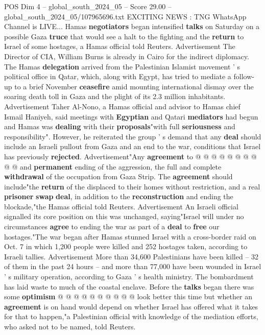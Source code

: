 \begin{textsample}{POS Dim 4 – global\_south\_2024\_05 – Score 29.00 – global\_south\_2024\_05/107965696.txt}  \label{ex:f4_pos_181}
EXCITING NEWS : TNG WhatsApp Channel is LIVE...
Hamas \textbf{negotiators} began intensified \textbf{talks} on Saturday on a possible Gaza \textbf{truce} that would see a halt to the fighting and the \textbf{return} to Israel of some hostages, a Hamas official told Reuters.
Advertisement The Director of CIA, William Burns is already in Cairo for the indirect diplomacy.
The Hamas \textbf{delegation} arrived from the Palestinian Islamist movement ' s political office in Qatar, which, along with Egypt, has tried to mediate a follow-up to a brief November \textbf{ceasefire} amid mounting international dismay over the soaring death toll in Gaza and the plight of its 2.3 million inhabitants.
Advertisement Taher Al-Nono, a Hamas official and advisor to Hamas chief Ismail Haniyeh, said meetings with \textbf{Egyptian} and Qatari \textbf{mediators} had begun and Hamas was \textbf{dealing} with their \textbf{proposals}"with full \textbf{seriousness} and responsibility".
However, he reiterated the group ' s demand that any \textbf{deal} should include an Israeli pullout from Gaza and an end to the war, conditions that Israel has previously \textbf{rejected}.
Advertisement"Any \textbf{agreement} to @ @ @ @ @ @ @ @ @ @ and \textbf{permanent} ending of the aggression, the full and complete \textbf{withdrawal} of the occupation from Gaza Strip.
The \textbf{agreement} should include"the \textbf{return} of the displaced to their homes without restriction, and a real \textbf{prisoner} \textbf{swap} \textbf{deal}, in addition to the \textbf{reconstruction} and ending the blockade,"the Hamas official told Reuters.
Advertisement An Israeli official signalled its core position on this was unchanged, saying"Israel will under no circumstances \textbf{agree} to ending the war as part of a \textbf{deal} to \textbf{free} our hostages."The war began after Hamas stunned Israel with a cross-border raid on Oct. 7 in which 1,200 people were killed and 252 hostages taken, according to Israeli tallies.
Advertisement More than 34,600 Palestinians have been killed -- 32 of them in the past 24 hours -- and more than 77,000 have been wounded in Israel ' s military operation, according to Gaza ' s health ministry.
The bombardment has laid waste to much of the coastal enclave.
Before the \textbf{talks} began there was some \textbf{optimism} @ @ @ @ @ @ @ @ @ @ look better this time but whether an \textbf{agreement} is on hand would depend on whether Israel has offered what it takes for that to happen,"a Palestinian official with knowledge of the mediation efforts, who asked not to be named, told Reuters.

\end{textsample}
